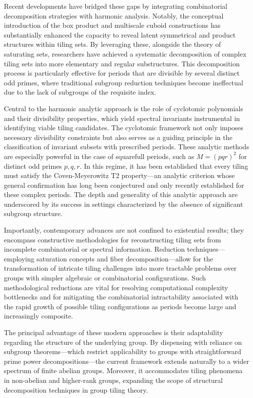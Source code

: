 \documentclass[sigconf]{acmart}
\begin{document}
Recent developments have bridged these gaps by integrating combinatorial decomposition strategies with harmonic analysis. Notably, the conceptual introduction of the box product and multiscale cuboid constructions has substantially enhanced the capacity to reveal latent symmetrical and product structures within tiling sets. By leveraging these, alongside the theory of saturating sets, researchers have achieved a systematic decomposition of complex tiling sets into more elementary and regular substructures. This decomposition process is particularly effective for periods that are divisible by several distinct odd primes, where traditional subgroup reduction techniques become ineffectual due to the lack of subgroups of the requisite index.

Central to the harmonic analytic approach is the role of cyclotomic polynomials and their divisibility properties, which yield spectral invariants instrumental in identifying viable tiling candidates. The cyclotomic framework not only imposes necessary divisibility constraints but also serves as a guiding principle in the classification of invariant subsets with prescribed periods. These analytic methods are especially powerful in the case of squarefull periods, such as \( M = (pqr)^2 \) for distinct odd primes \( p, q, r \). In this regime, it has been established that every tiling must satisfy the Coven-Meyerowitz T2 property---an analytic criterion whose general confirmation has long been conjectured and only recently established for these complex periods. The depth and generality of this analytic approach are underscored by its success in settings characterized by the absence of significant subgroup structure.

Importantly, contemporary advances are not confined to existential results; they encompass constructive methodologies for reconstructing tiling sets from incomplete combinatorial or spectral information. Reduction techniques---employing saturation concepts and fiber decomposition---allow for the transformation of intricate tiling challenges into more tractable problems over groups with simpler algebraic or combinatorial configurations. Such methodological reductions are vital for resolving computational complexity bottlenecks and for mitigating the combinatorial intractability associated with the rapid growth of possible tiling configurations as periods become large and increasingly composite.

The principal advantage of these modern approaches is their adaptability regarding the structure of the underlying group. By dispensing with reliance on subgroup theorems---which restrict applicability to groups with straightforward prime power decompositions---the current framework extends naturally to a wider spectrum of finite abelian groups. Moreover, it accommodates tiling phenomena in non-abelian and higher-rank groups, expanding the scope of structural decomposition techniques in group tiling theory.
\end{document}
